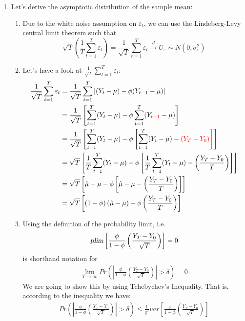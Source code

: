 \begin{enumerate}
\item Let's derive the asymptotic distribution of the sample mean:
\begin{enumerate}
    \item Due to the white noise assumption on \(\varepsilon_t\),
      we can use the Lindeberg-Levy central limit theorem such that
    \begin{equation*}
    \sqrt{T} \left(\frac{1}{T} \sum_{t=1}^T \varepsilon_t \right) = \frac{1}{\sqrt{T}} \sum_{t=1}^T \varepsilon_t  \overset{d}{\rightarrow} U_\varepsilon \sim N(0,\sigma_\varepsilon^2)
    \end{equation*}
    \item Let's have a look at \(\frac{1}{\sqrt{T}} \sum_{t=1}^T \varepsilon_t\):
    \begin{align*}
    \frac{1}{\sqrt{T}} \sum_{t=1}^T \varepsilon_t
    &= \frac{1}{\sqrt{T}} \sum_{t=1}^T \left[(Y_t-\mu)-\phi(Y_{t-1}-\mu)\right]\\
    &= \frac{1}{\sqrt{T}} \left[\sum_{t=1}^T (Y_t-\mu)- \phi\sum_{t=1}^T(Y_{\color{red}{t-1}}-\mu)\right]\\
    &= \frac{1}{\sqrt{T}} \left[\sum_{t=1}^T (Y_t-\mu)- \phi\left[\sum_{t=1}^T(Y_{\color{red}{t}}-\mu)-\color{red}{(Y_T - Y_0)}\right]\right]\\
    &= \sqrt{T} \left[\frac{1}{T}\sum_{t=1}^T (Y_t-\mu)- \phi\left[\frac{1}{T}\sum_{t=1}^T(Y_{t}-\mu)-\left(\frac{Y_T - Y_0}{T}\right)\right]\right]\\
    &= \sqrt{T} \left[\hat{\mu}-\mu- \phi\left[\hat{\mu}-\mu-\left(\frac{Y_T - Y_0}{T}\right)\right]\right]\\
    &= \sqrt{T}\left[(1-\phi)\left(\hat{\mu}-\mu\right) + \phi\left(\frac{Y_T - Y_0}{T}\right)\right]
    \end{align*}
    \item Using the definition of the probability limit, i.e.
    \begin{align*}
    \textsl{plim}\left[\frac{\phi}{1-\phi}\left(\frac{Y_T - Y_0}{\sqrt{T}}\right)\right] = 0
    \end{align*}
    is shorthand notation for
    \begin{align*}
    \lim_{T\rightarrow \infty} Pr\left(\left|\frac{\phi}{1-\phi}\left(\frac{Y_T - Y_0}{\sqrt{T}}\right)\right|> \delta\right) = 0
    \end{align*}
    We are going to show this by using Tchebychev's Inequality.
    That is, according to the inequality we have:
    \begin{align*}
    Pr\left(\left|\frac{\phi}{1-\phi}\left(\frac{Y_T - Y_0}{\sqrt{T}}\right)\right|> \delta\right) \leq \frac{1}{\delta^2} var\left[\frac{\phi}{1-\phi}\left(\frac{Y_T - Y_0}{\sqrt{T}}\right)\right]

\end{align*}
\end{enumerate}
\end{enumerate}
